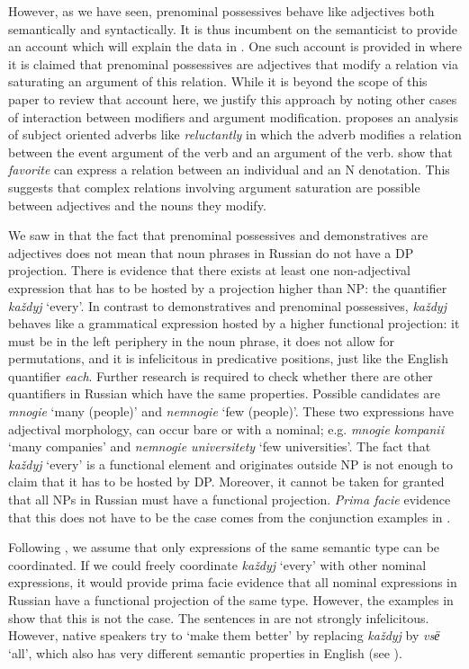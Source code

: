 \documentclass[output=paper,
colorlinks,
citecolor=brown,
newtxmath
]{langscibook}
\begin{document}
However, as we have seen, prenominal possessives behave like adjectives both semantically and syntactically. It is thus incumbent on the semanticist to provide an account which will explain the data in . One such account is provided in \citet{Gepner2021a} where it is claimed that prenominal possessives are adjectives that modify a relation via saturating an argument of this relation. While it is beyond the scope of this paper to review that account here, we justify this approach by noting other cases of interaction between modifiers and argument modification. \citet{Landman2000} proposes an analysis of subject oriented adverbs like \textit{reluctantly} in which the adverb modifies a relation between the event argument of the verb and an argument of the verb. \citet{Partee.Borschev1999} show that \textit{favorite} can express a relation between an individual and an N denotation. This suggests that complex relations involving argument saturation are possible between adjectives and the nouns they modify.

We saw in  that the fact that prenominal possessives and demonstratives are adjectives does not mean that noun phrases in Russian do not have a DP projection. There is evidence that there exists at least one non-adjectival expression that has to be hosted by a projection higher than NP: the quantifier \textit{každyj} `every'. In contrast to demonstratives and prenominal possessives, \textit{každyj} behaves like a grammatical expression hosted by a higher functional projection: it must be in the left periphery in the noun phrase, it does not allow for permutations, and it is infelicitous in predicative positions, just like the English quantifier \textit{each}. Further research is required to check whether there are other quantifiers in Russian which have the same properties. Possible candidates are \textit{mnogie} `many (people)' and \textit{nemnogie} `few (people)'. These two expressions have adjectival morphology, can occur bare or with a nominal; e.g. \textit{mnogie kompanii} `many companies' and \textit{nemnogie universitety} `few universities'. 
The fact that \textit{každyj} `every' is a functional element and originates outside NP is not enough to claim that it has to be hosted by DP. Moreover, it cannot be taken for granted that all NPs in Russian must have a functional projection. \textit{Prima facie} evidence that this does not have to be the case comes from the conjunction examples in . 

Following \citet{Partee1987}, we assume that only expressions of the same semantic type can be coordinated. If we could freely coordinate \textit{každyj} `every' with other nominal expressions, it would provide prima facie evidence that all nominal expressions in Russian have a functional projection of the same type. However, the examples in  show that this is not the case. The sentences in  are not strongly infelicitous. However, native speakers try to `make them better' by replacing \textit{každyj} by \textit{vsё} `all', which also has very different semantic properties in English (see \citealt{Dowty1987, Dowty.Brody1984}).
\end{document}
